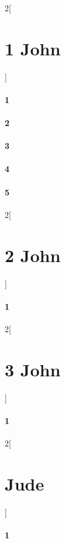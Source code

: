 \documentclass{book}
\begin{document}
\begin{multicols}{2}[\part{1 John}]
\subsection*{1}
\subsection*{2}
\subsection*{3}
\subsection*{4}
\subsection*{5}
\end{multicols}
\begin{multicols}{2}[\part{2 John}]
\subsection*{1}
\end{multicols}
\begin{multicols}{2}[\part{3 John}]
\subsection*{1}
\end{multicols}
\begin{multicols}{2}[\part{Jude}]
\subsection*{1}
\end{multicols}
\end{document}
